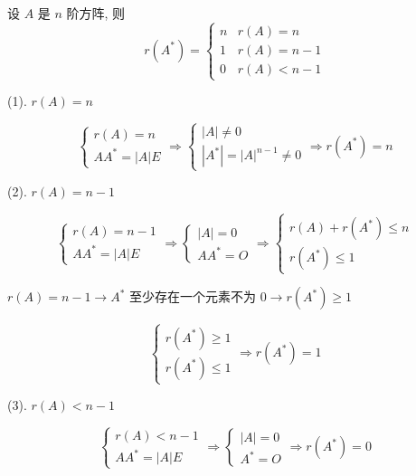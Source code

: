 \begin{proposition}
	设 $A$ 是 $n$ 阶方阵, 则 
	$$r(A^{*}) = 
	\begin{cases}
		n & r(A) = n\\
		1 & r(A) = n-1\\
		0 & r(A) < n-1	
	\end{cases}$$
\end{proposition}
\begin{anymark}[证明]

	(1). $r(A) = n$

	$$\begin{cases}
	  r(A) = n \\
	  AA^{*} = |A|E
	\end{cases}\Rightarrow
	\begin{cases}
	  |A| \neq 0\\
	  |A^{*}| = |A|^{n-1} \neq 0
	\end{cases}\Rightarrow r(A^{*}) = n$$

	(2). $r(A) = n-1$

	$$\begin{cases}
	  r(A) = n-1\\
	  AA^{*} = |A|E
	\end{cases}\Rightarrow 
	\begin{cases}
	  |A| = 0\\
	  AA^{*} = O
	\end{cases}\Rightarrow
	\begin{cases}
	  r(A) + r(A^{*}) \leq n\\
	  r(A^{*}) \leq 1
	\end{cases}$$

	$r(A) = n-1 \to A^{*}$ 至少存在一个元素不为 $0 \to r(A^{*}) \geq 1$

	$$\begin{cases}
	  r(A^{*}) \geq 1\\
	  r(A^{*}) \leq 1
	\end{cases}\Rightarrow r(A^{*}) = 1$$

	(3). $r(A) < n-1$

	$$\begin{cases}
	  r(A) < n-1\\
	  AA^{*} = |A|E
	\end{cases}\Rightarrow 
	\begin{cases}
	  |A| = 0\\
	  A^{*} = O
	\end{cases}\Rightarrow r(A^{*}) = 0$$
\end{anymark}


